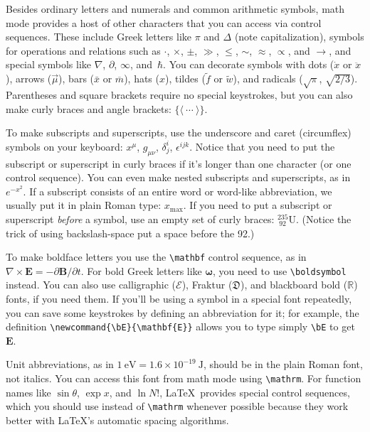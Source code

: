 \documentclass[prb,preprint]{revtex4-2}
\begin{document}
Besides ordinary letters and numerals and common arithmetic symbols, math 
mode provides a host of other characters that you can access via control 
sequences.\cite{wikimathpage} These include Greek letters like $\pi$ and 
$\Delta$ (note capitalization), symbols for operations and relations such 
as $\cdot$, $\times$, $\pm$, $\gg$, $\leq$, $\sim$, $\approx$, $\propto$, 
and $\rightarrow$, and special symbols like $\nabla$, $\partial$, $\infty$, 
and~$\hbar$. You can decorate symbols with dots ($\dot x$ or $\ddot x$), 
arrows ($\vec\mu$), bars ($\bar x$ or $\overline m$), hats ($\hat x$), 
tildes ($\tilde f$ or $\widetilde w$), and radicals ($\sqrt\pi$, $\sqrt{2/3}$).
Parentheses and square brackets require no special keystrokes, but you
can also make curly braces and angle brackets: $\{\langle\ \cdots\ \rangle\}$.

To make subscripts and superscripts, use the underscore and caret 
(circumflex) symbols on your keyboard: $x^\mu$, $g_{\mu\nu}$, $\delta^i_j$, 
$\epsilon^{ijk}$.  Notice that you need to put the subscript or superscript 
in curly braces if it's longer than one character (or one control sequence). 
You can even make nested subscripts and superscripts, as in $e^{-x^2}$.  
If a subscript consists of an entire word or word-like abbreviation, 
we usually put it in plain Roman type: $x_\textrm{max}$.  If you need to 
put a subscript or superscript \textit{before} a symbol, use an empty
set of curly braces: ${}^{235}_{\ 92}\textrm{U}$. (Notice the trick of using 
backslash-space put a space before the 92.)

\newcommand{\bE}{\mathbf{E}}   %

To make boldface letters you use the \verb/\mathbf/ control sequence, as in
$\nabla\times\mathbf{E} = -\partial\mathbf{B}/\partial t$.  For bold Greek
letters like $\boldsymbol{\omega}$, you need to use \verb/\boldsymbol/
instead.  You can also use calligraphic ($\mathcal{E}$), Fraktur 
($\mathfrak{D}$), and blackboard bold ($\mathbb{R}$) fonts, if you need them. 
If you'll be using a symbol in a special font repeatedly, you can save 
some keystrokes by defining an abbreviation for it; for example, the 
definition \verb/\newcommand{\bE}{\mathbf{E}}/ allows you to type simply 
\verb/\bE/ to get $\bE$.

Unit abbreviations, as in $1~\mathrm{eV} = 1.6\times10^{-19}~\mathrm{J}$,
should be in the plain Roman font, not italics.  You can access this font
from math mode using \verb/\mathrm/. For function names like $\sin\theta$, 
$\exp x$, and $\ln N!$, \LaTeX\ provides special control sequences, 
which you should use instead of \verb/\mathrm/ whenever possible because
they work better with \LaTeX's automatic spacing algorithms.
\end{document}
